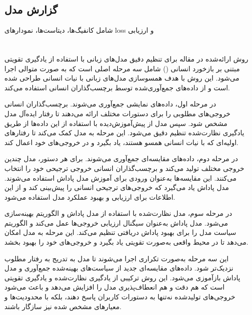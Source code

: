 \documentclass[11pt, a4paper, oneside]{book}
\begin{document}
			
			\subsection{گزارش  مدل}
			
				شامل کانفیگ‌ها، دیتاست‌ها، نمودارهای loss و ارزیابی
				
			
		\section{}
			\subsection{}
			
				روش ارائه‌شده در مقاله برای تنظیم دقیق مدل‌های زبانی با استفاده از یادگیری تقویتی مبتنی بر بازخورد انسانی () شامل سه مرحله اصلی است که به صورت متوالی اجرا می‌شود. این روش با هدف همسوسازی مدل‌های زبانی با نیات انسانی طراحی شده است و از داده‌های جمع‌آوری‌شده توسط برچسب‌گذاران انسانی استفاده می‌کند.
				
				در مرحله اول، داده‌های نمایشی جمع‌آوری می‌شوند. برچسب‌گذاران انسانی خروجی‌های مطلوبی را برای دستورات مختلف ارائه می‌دهند تا رفتار ایده‌آل مدل مشخص شود. سپس مدل  از پیش‌آموزش‌دیده با استفاده از این داده‌ها از طریق یادگیری نظارت‌شده تنظیم دقیق می‌شود. این مرحله به مدل کمک می‌کند تا رفتارهای اولیه‌ای که با نیات انسانی همسو هستند، یاد بگیرد و در خروجی‌های خود اعمال کند.
				
				در مرحله دوم، داده‌های مقایسه‌ای جمع‌آوری می‌شوند. برای هر دستور، مدل چندین خروجی مختلف تولید می‌کند و برچسب‌گذاران انسانی خروجی ترجیحی خود را انتخاب می‌کنند. این مقایسه‌ها به‌عنوان ورودی برای آموزش مدل پاداش استفاده می‌شوند. مدل پاداش یاد می‌گیرد که خروجی‌های ترجیحی انسانی را پیش‌بینی کند و از این اطلاعات برای ارزیابی و بهبود عملکرد مدل استفاده می‌شود.
				
				در مرحله سوم، مدل نظارت‌شده با استفاده از مدل پاداش و الگوریتم  بهینه‌سازی می‌شود. مدل پاداش به‌عنوان سیگنال ارزیابی خروجی‌ها عمل می‌کند و الگوریتم  سیاست مدل را برای بهبود پاداش دریافتی تنظیم می‌کند. این مرحله به مدل امکان می‌دهد تا در محیط واقعی به‌صورت تقویتی یاد بگیرد و خروجی‌های خود را بهبود بخشد.
				
				این سه مرحله به‌صورت تکراری اجرا می‌شوند تا مدل به تدریج به رفتار مطلوب نزدیک‌تر شود. داده‌های مقایسه‌ای جدید از سیاست‌های بهینه‌شده جمع‌آوری و مدل پاداش بازآموزی می‌شود. این روش ترکیبی از یادگیری نظارت‌شده و یادگیری تقویتی است که هم دقت و هم انعطاف‌پذیری مدل را افزایش می‌دهد و باعث می‌شود خروجی‌های تولیدشده نه‌تنها به دستورات کاربران پاسخ دهند، بلکه با محدودیت‌ها و معیارهای مشخص شده نیز سازگار باشند. \cite{ouyang_training_2022}
					
\end{document}
